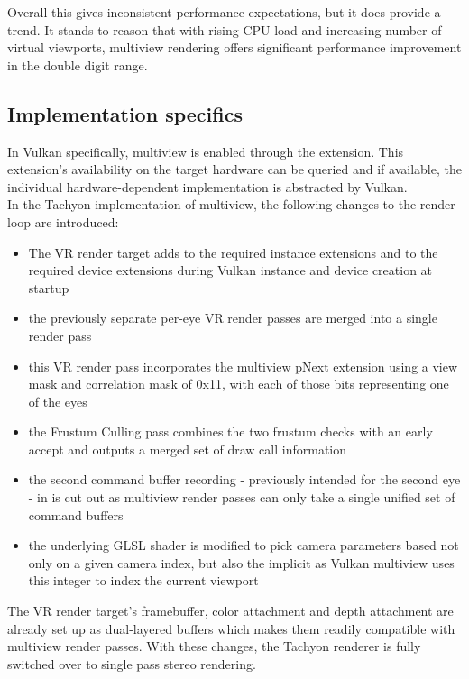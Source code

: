 Overall this gives inconsistent performance expectations, but it does provide a trend. It stands to reason that with rising CPU load and increasing number of virtual viewports, multiview rendering offers significant performance improvement in the double digit range. 

\subsection{Implementation specifics}
In Vulkan specifically, multiview is enabled through the  extension. This extension's availability on the target hardware can be queried and if available, the individual hardware-dependent implementation is abstracted by Vulkan. \\
In the \gls{Tachyon} implementation of multiview, the following changes to the render loop are introduced: 
\begin{itemize}
\item The \gls{VR} render target adds  to the required instance extensions and  to the required device extensions during Vulkan instance and device creation at startup
\item the previously separate per-eye \gls{VR} render passes are merged into a single render pass
\item this \gls{VR} render pass incorporates the multiview pNext extension using a view mask and correlation mask of 0x11, with each of those bits representing one of the eyes
\item the Frustum Culling pass combines the two frustum checks with an early accept and outputs a merged set of draw call information
\item the second command buffer recording - previously intended for the second eye - in  is cut out as multiview render passes can only take a single unified set of command buffers
\item the underlying GLSL shader is modified to pick camera parameters based not only on a given camera index, but also the implicit  as Vulkan multiview uses this integer to index the current viewport
\end{itemize}
The \gls{VR} render target's framebuffer, color attachment and depth attachment are already set up as dual-layered buffers which makes them readily compatible with multiview render passes. With these changes, the \gls{Tachyon} renderer is fully switched over to single pass stereo rendering. 